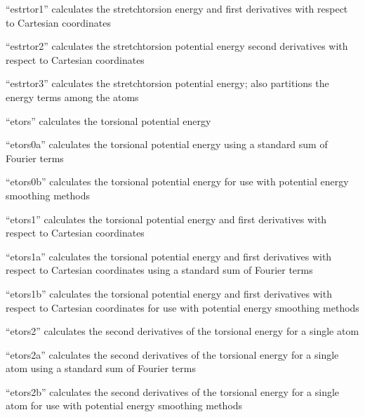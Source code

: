 \documentclass[letterpaper,11pt,english]{sphinxmanual}
\begin{document}
“estrtor1” calculates the stretch\sphinxhyphen{}torsion energy and first
derivatives with respect to Cartesian coordinates


“estrtor2” calculates the stretch\sphinxhyphen{}torsion potential energy
second derivatives with respect to Cartesian coordinates


“estrtor3” calculates the stretch\sphinxhyphen{}torsion potential energy;
also partitions the energy terms among the atoms


“etors” calculates the torsional potential energy


“etors0a” calculates the torsional potential energy
using a standard sum of Fourier terms


“etors0b” calculates the torsional potential energy
for use with potential energy smoothing methods


“etors1” calculates the torsional potential energy and first
derivatives with respect to Cartesian coordinates


“etors1a” calculates the torsional potential energy and first
derivatives with respect to Cartesian coordinates using a
standard sum of Fourier terms


“etors1b” calculates the torsional potential energy and first
derivatives with respect to Cartesian coordinates for use with
potential energy smoothing methods


“etors2” calculates the second derivatives of the torsional
energy for a single atom


“etors2a” calculates the second derivatives of the torsional
energy for a single atom using a standard sum of Fourier terms


“etors2b” calculates the second derivatives of the torsional
energy for a single atom for use with potential energy
smoothing methods
\end{document}
